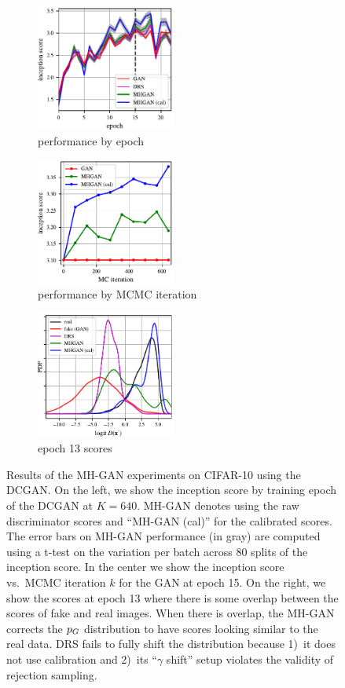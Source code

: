 \begin{figure}[htbp]
    \centering
    \begin{subfigure}[b]{0.32\textwidth}
       \centering
       \includegraphics[width=1.8in]{figures/per_epoch.pdf}
       \caption{performance by epoch}
       \label{fig:incep_by_epoch}
    \end{subfigure}
    \begin{subfigure}[b]{0.32\textwidth}
       \centering
       \includegraphics[width=1.8in]{figures/plot_per_mh.pdf}
       \caption{performance by MCMC iteration}
       \label{fig:incep_by_iter}
    \end{subfigure}
    \begin{subfigure}[b]{0.32\textwidth}
       \centering
       \includegraphics[width=1.8in]{figures/score_dist_bta.pdf}
       \caption{epoch 13 scores}
       \label{fig:score_dist_overlap}
    \end{subfigure}
    \caption{{\small
    Results of the MH-GAN experiments on CIFAR-10 using the DCGAN\@.
    On the left, we show the inception score by training epoch of the DCGAN at $K=640$.
    MH-GAN denotes using the raw discriminator scores and ``MH-GAN (cal)'' for the calibrated scores.
    The error bars on MH-GAN performance (in gray) are computed using a t-test on the variation per batch across 80 splits of the inception score.
    In the center we show the inception score vs.~MCMC iteration $k$ for the GAN at epoch 15.
    On the right, we show the scores at epoch 13 where there is some overlap between the scores of fake and real images.
    When there is overlap, the MH-GAN corrects the ${p_G}$ distribution to have scores looking similar to the real data.
    DRS fails to fully shift the distribution because 1)~it does not use calibration and 2)~its ``$\gamma$ shift'' setup violates the validity of rejection sampling.
    }}
    \label{fig:inception}
\end{figure}

